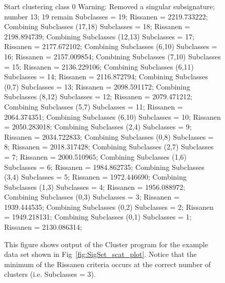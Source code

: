 \documentclass[12pt]{article}
\begin{document}
\begin{figure}
\begin{center}
\parbox{5in}{\small
\noindent
Start clustering class 0\newline
Warning: Removed a singular subsignature; number 13; 19 remain\newline
Subclasses = 19; Rissanen = 2219.733222; Combining Subclasses (17,18)\newline
Subclasses = 18; Rissanen = 2198.894739; Combining Subclasses (12,13)\newline
Subclasses = 17; Rissanen = 2177.672102; Combining Subclasses (6,10)\newline
Subclasses = 16; Rissanen = 2157.009854; Combining Subclasses (7,10)\newline
Subclasses = 15; Rissanen = 2136.229106; Combining Subclasses (6,11)\newline
Subclasses = 14; Rissanen = 2116.872794; Combining Subclasses (0,7)\newline
Subclasses = 13; Rissanen = 2098.591172; Combining Subclasses (8,12)\newline
Subclasses = 12; Rissanen = 2079.471212; Combining Subclasses (5,7)\newline
Subclasses = 11; Rissanen = 2064.374351; Combining Subclasses (6,10)\newline
Subclasses = 10; Rissanen = 2050.283018; Combining Subclasses (2,4)\newline
Subclasses = 9; Rissanen = 2034.722833; Combining Subclasses (0,8)\newline
Subclasses = 8; Rissanen = 2018.317428; Combining Subclasses (2,7)\newline
Subclasses = 7; Rissanen = 2000.510965; Combining Subclasses (1,6)\newline
Subclasses = 6; Rissanen = 1984.862735; Combining Subclasses (3,4)\newline
Subclasses = 5; Rissanen = 1972.446690; Combining Subclasses (1,3)\newline
Subclasses = 4; Rissanen = 1956.088972; Combining Subclasses (0,3)\newline
Subclasses = 3; Rissanen = 1939.444535; Combining Subclasses (0,2)\newline
Subclasses = 2; Rissanen = 1949.218131; Combining Subclasses (0,1)\newline
Subclasses = 1; Rissanen = 2130.086314;\newline
}
\end{center}
\caption{This figure shows output of the Cluster program for the example data
set shown in Fig~\ref{fig:SigSet_scat_plot}. Notice that the minimum of the Rissanen
criteria occurs at the correct number of clusters (i.e. Subclasses = 3). }
\label{fig:SigSet_output}
\end{figure}
\end{document}
